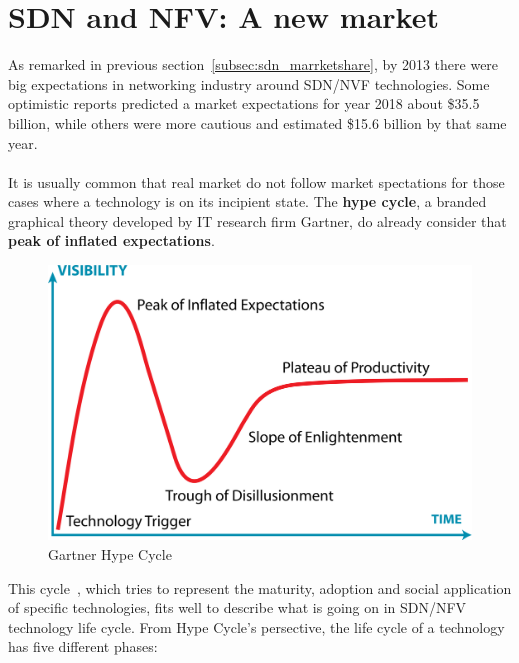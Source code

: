 \documentclass[a4paper, 12pt]{book}
\begin{document}
\section{SDN and NFV: A new market}
\label{sec:odlnewmarket}

As remarked in previous section~\ref{subsec:sdn_marrketshare}, by 2013 there were big expectations in networking industry around SDN/NVF technologies. Some optimistic reports predicted a market expectations for year 2018 about \$35.5 billion, while others were more cautious and estimated \$15.6 billion by that same year.\\
\\
It is usually common that real market do not follow market spectations for those cases where a technology is on its incipient state. The \textbf{hype cycle}, a branded graphical theory developed by IT research firm Gartner, do already consider that \textbf{peak of inflated expectations}.
\begin{center}
 \begin{figure}[H]
 \begin{center}
   \includegraphics[width=15cm]{img/hype-cycle-00.png}
   \caption{Gartner Hype Cycle}
   \label{fig:gartner_hype_cyle}
 \end{center}
 \end{figure}
\end{center}
This cycle~\cite{HypeCycle}, which tries to represent the maturity, adoption and social application of specific technologies, fits well to describe what is going on in SDN/NFV technology life cycle. From Hype Cycle's persective, the life cycle of a technology has five different phases:
\end{document}
